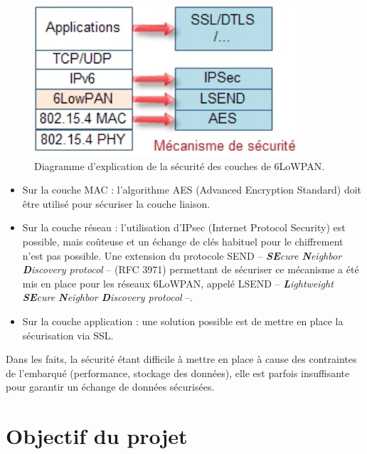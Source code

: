 		\begin{figure}[htp]
			\centering
			\includegraphics[width=10cm]{images/6lowpan-secu.jpg}
			\caption{Diagramme d'explication de la sécurité des couches de 6LoWPAN.}
			\label{fig:diagramme-6lowpan-secu}
		\end{figure}
		
		\begin{itemize}
			\item Sur la couche MAC : l'algorithme AES (Advanced Encryption Standard) doit être utilisé pour sécuriser la couche liaison.
			\item Sur la couche réseau : l'utilisation d'IPsec (Internet Protocol Security) est possible, mais coûteuse et un échange de clés habituel pour le chiffrement n'est pas possible. Une extension du protocole SEND -- \emph{\textbf{SE}cure \textbf{N}eighbor \textbf{D}iscovery protocol} -- (RFC 3971) permettant de sécuriser ce mécanisme a été mis en place pour les réseaux 6LoWPAN, appelé LSEND -- \emph{\textbf{L}ightweight \textbf{SE}cure \textbf{N}eighbor \textbf{D}iscovery protocol} --.
			\item Sur la couche application : une solution possible est de mettre en place la sécurisation via SSL.
		\end{itemize}
		
		Dans les faits, la sécurité étant difficile à mettre en place à cause des contraintes de l'embarqué (performance, stockage des données), elle est parfois insuffisante pour garantir un échange de données sécurisées.



\section{Objectif du projet}

